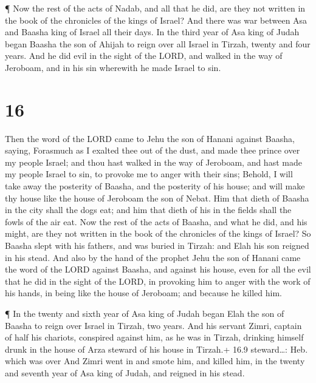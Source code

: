  ¶ Now the rest of the acts of Nadab, and all that he did,
are they not written in the book of the chronicles of the kings of
Israel?  And there was war between Asa and Baasha king of
Israel all their days.  In the third year of Asa king of
Judah began Baasha the son of Ahijah to reign over all Israel in Tirzah,
twenty and four years.  And he did evil in the sight of the
LORD, and walked in the way of Jeroboam, and in his sin wherewith he
made Israel to sin.

\hypertarget{section-15}{%
\section{16}\label{section-15}}

 Then the word of the LORD came to Jehu the son of Hanani
against Baasha, saying,  Forasmuch as I exalted thee out of
the dust, and made thee prince over my people Israel; and thou hast
walked in the way of Jeroboam, and hast made my people Israel to sin, to
provoke me to anger with their sins;  Behold, I will take
away the posterity of Baasha, and the posterity of his house; and will
make thy house like the house of Jeroboam the son of Nebat. 
Him that dieth of Baasha in the city shall the dogs eat; and him that
dieth of his in the fields shall the fowls of the air eat. 
Now the rest of the acts of Baasha, and what he did, and his might, are
they not written in the book of the chronicles of the kings of Israel?
 So Baasha slept with his fathers, and was buried in Tirzah:
and Elah his son reigned in his stead.  And also by the hand
of the prophet Jehu the son of Hanani came the word of the LORD against
Baasha, and against his house, even for all the evil that he did in the
sight of the LORD, in provoking him to anger with the work of his hands,
in being like the house of Jeroboam; and because he killed him.

 ¶ In the twenty and sixth year of Asa king of Judah began
Elah the son of Baasha to reign over Israel in Tirzah, two years.
 And his servant Zimri, captain of half his chariots,
conspired against him, as he was in Tirzah, drinking himself drunk in
the house of Arza steward of his house in Tirzah.+ 16.9 steward\ldots:
Heb. which was over  And Zimri went in and smote him, and
killed him, in the twenty and seventh year of Asa king of Judah, and
reigned in his stead.

